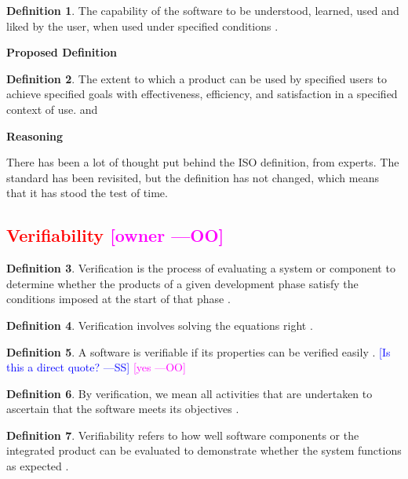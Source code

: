 \documentclass[letterpaper, cleveref]{lipics-v2019}
\newcommand{\authornote}[3]{\textcolor{#1}{[#3 ---#2]}}
\newcommand{\authornote}[3]{}
\newcommand{\wss}[1]{\authornote{blue}{SS}{#1}} %
\newcommand{\oo}[1]{\authornote{magenta}{OO}{#1}} %
\newcommand{\notdone}[1]{\textcolor{red}{#1}}
\theoremstyle{definition}
\newtheorem{defn}{Definition}
\begin{document}
\begin{defn}
  The capability of the software to be understood, learned, used and liked by
  the user, when used under specified conditions \cite{ISO9126}.
\end{defn}
\noindent \textbf{Proposed Definition}

\begin{defn}
  The extent to which a product can be used by specified users to achieve
  specified goals with effectiveness, efficiency, and satisfaction in a
  specified context of use. \cite{ISO16982:2002} and \cite{ISO9241:11}
\end{defn}

\noindent \textbf{Reasoning}

There has been a lot of thought put behind the ISO definition, from experts.
The standard has been revisited, but the definition has not changed, which 
means that it has stood the test of time.


\subsection{\notdone{Verifiability} \oo{owner}}

\begin{defn}
	 Verification is the process of evaluating a system or component to
   determine whether the products of a given development phase satisfy the
   conditions imposed at the start of that phase
   \citep{IEEEStdGlossarySET1990}.
\end{defn}

\begin{defn}
	Verification involves solving the equations right \citep[p.~23]{Roache1998}.
\end{defn}

\begin{defn}
  A software is verifiable if its properties can be verified easily
  \citep{GhezziEtAl2003}.  \wss{Is this a direct quote?} \oo{yes}
\end{defn}

\begin{defn}
	By verification, we mean all activities that are undertaken to ascertain
  that the software meets its objectives \citep{GhezziEtAl2003}.
\end{defn}

\begin{defn}
	Verifiability refers to how well software components or the integrated
  product can be evaluated to demonstrate whether the system functions as
  expected \citep{wiegers2003softreq}.
\end{defn}
\end{document}
